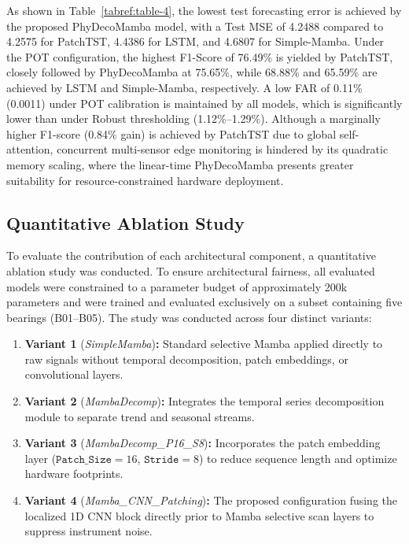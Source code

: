 \documentclass[runningheads]{llncs}
\begin{document}
As shown in Table~\ref{tabref:table-4}, the lowest test forecasting error is achieved by the proposed PhyDecoMamba model, with a Test MSE of 4.2488 compared to 4.2575 for PatchTST, 4.4386 for LSTM, and 4.6807 for Simple-Mamba. Under the POT configuration, the highest F1-Score of 76.49\% is yielded by PatchTST, closely followed by PhyDecoMamba at 75.65\%, while 68.88\% and 65.59\% are achieved by LSTM and Simple-Mamba, respectively. A low FAR of 0.11\% (0.0011) under POT calibration is maintained by all models, which is significantly lower than under Robust thresholding (1.12\%--1.29\%). Although a marginally higher F1-score (0.84\% gain) is achieved by PatchTST due to global self-attention, concurrent multi-sensor edge monitoring is hindered by its quadratic memory scaling, where the linear-time PhyDecoMamba presents greater suitability for resource-constrained hardware deployment.

\subsection{Quantitative Ablation Study} \label{sect:s5dot3}
To evaluate the contribution of each architectural component, a quantitative ablation study was conducted. To ensure architectural fairness, all evaluated models were constrained to a parameter budget of approximately 200k parameters and were trained and evaluated exclusively on a subset containing five bearings (B01--B05). The study was conducted across four distinct variants:
\begin{enumerate}
    \item \textbf{Variant 1} (\textit{SimpleMamba})\textbf{:} Standard selective Mamba applied directly to raw signals without temporal decomposition, patch embeddings, or convolutional layers.
    \item \textbf{Variant 2} (\textit{MambaDecomp})\textbf{:} Integrates the temporal series decomposition module to separate trend and seasonal streams.
    \item \textbf{Variant 3} (\textit{MambaDecomp\_P16\_S8})\textbf{:} Incorporates the patch embedding layer ($\texttt{Patch\_Size} = 16$, $\texttt{Stride} = 8$) to reduce sequence length and optimize hardware footprints.
    \item \textbf{Variant 4} (\textit{Mamba\_CNN\_Patching})\textbf{:} The proposed configuration fusing the localized 1D CNN block directly prior to Mamba selective scan layers to suppress instrument noise.
\end{enumerate}
\end{document}

